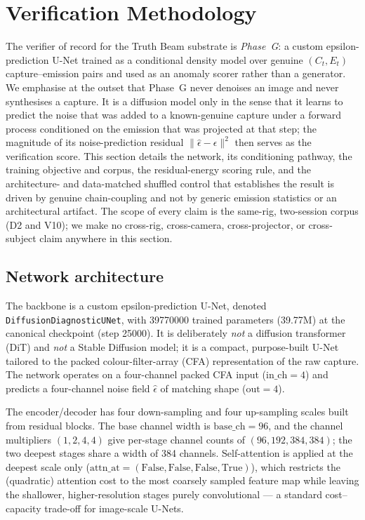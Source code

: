 \section{Verification Methodology}
\label{sec:verifier_method}

The verifier of record for the Truth Beam substrate is \emph{Phase~G}: a custom epsilon-prediction U-Net trained as a conditional density model over genuine $(C_t, E_t)$ capture--emission pairs and used as an anomaly scorer rather than a generator. We emphasise at the outset that Phase~G never denoises an image and never synthesises a capture. It is a diffusion model only in the sense that it learns to predict the noise that was added to a known-genuine capture under a forward process conditioned on the emission that was projected at that step; the magnitude of its noise-prediction residual $\lVert \hat{\epsilon}-\epsilon \rVert^2$ then serves as the verification score. This section details the network, its conditioning pathway, the training objective and corpus, the residual-energy scoring rule, and the architecture- and data-matched shuffled control that establishes the result is driven by genuine chain-coupling and not by generic emission statistics or an architectural artifact. The scope of every claim is the same-rig, two-session corpus (D2 and V10); we make no cross-rig, cross-camera, cross-projector, or cross-subject claim anywhere in this section.

\subsection{Network architecture}

The backbone is a custom epsilon-prediction U-Net, denoted \texttt{DiffusionDiagnosticUNet}, with \num{39770000} trained parameters (39.77M) at the canonical checkpoint (step \num{25000}). It is deliberately \emph{not} a diffusion transformer (DiT) and \emph{not} a Stable Diffusion model; it is a compact, purpose-built U-Net tailored to the packed colour-filter-array (CFA) representation of the raw capture. The network operates on a four-channel packed CFA input ($\text{in\_ch}=4$) and predicts a four-channel noise field $\hat{\epsilon}$ of matching shape ($\text{out}=4$).

The encoder/decoder has four down-sampling and four up-sampling scales built from residual blocks. The base channel width is $\text{base\_ch}=96$, and the channel multipliers $(1,2,4,4)$ give per-stage channel counts of $(96,192,384,384)$; the two deepest stages share a width of 384 channels. Self-attention is applied at the deepest scale only ($\text{attn\_at}=(\mathrm{False},\mathrm{False},\mathrm{False},\mathrm{True})$), which restricts the (quadratic) attention cost to the most coarsely sampled feature map while leaving the shallower, higher-resolution stages purely convolutional --- a standard cost--capacity trade-off for image-scale U-Nets.

